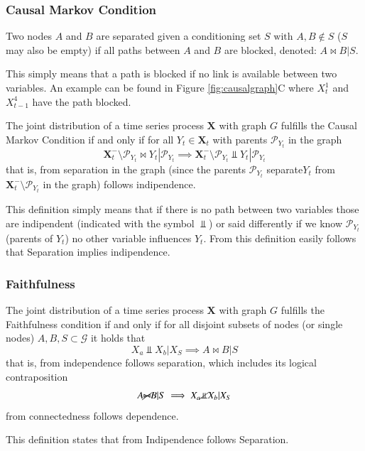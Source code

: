 \subsubsection*{Causal Markov Condition}
\begin{tcolorbox}[colback=red!5!white,colframe=red!75!black,title=\textbf{Separation Definition}]
    Two nodes $A$ and $B$ are separated given a conditioning set $S \text{ with } A, B \notin S$ 
    ($S$ may also be empty) if all paths between $A$ and $B$ are blocked, denoted:
    $A\bowtie B|S$.
\end{tcolorbox}
This simply means that a path is blocked if no link is available between two variables.
An example can be found in Figure \ref{fig:causalgraph}C where $X^1_t$ and $X^4_{t-1}$ have the path blocked.
\begin{tcolorbox}[colback=red!5!white,colframe=red!75!black,title=\textbf{Cusal Markov condition Definition}]
    The joint distribution of a time series process $\bm{X}$ with
    graph $G$ fulfills the Causal Markov Condition if and only if
    for all $Y_t\in \bm{X}_t$ with parents $\mathcal{P}_{Y_t}$ in the graph\\
    \begin{equation*}
        \bm{X}^-_t\setminus\mathcal{P}_{Y_t}\bowtie Y_t | \mathcal{P}_{Y_t}\implies\bm{X}^-_t\setminus\mathcal{P}_{Y_t}\Perp Y_t | \mathcal{P}_{Y_t}
    \end{equation*}
    that is, from separation in the graph (since the parents $\mathcal{P}_{Y_t}$ separate$Y_t$ from $\bm{X}^-_t\setminus\mathcal{P}_{Y_t}$ in the graph) follows indipendence.
\end{tcolorbox}
This definition simply means that if there is no path between two variables those are indipendent (indicated with the symbol $\Perp$) or said differently if we know $\mathcal{P}_{Y_t}$ (parents of $Y_t$) no other variable influences $Y_t$.
From this definition easily follows that Separation implies indipendence.

\subsubsection*{Faithfulness}
\begin{tcolorbox}[colback=red!5!white,colframe=red!75!black,title=\textbf{Faithfulness Definition}]
    The joint distribution of a time series process $\bm{X}$ with
    graph $G$ fulfills the Faithfulness condition if and only if for all
    disjoint subsets of nodes (or single nodes) $A, B, S \subset\mathcal{G}$ it
    holds that
    \begin{equation*}
        X_a \Perp X_b|X_S\implies A\bowtie B|S
    \end{equation*}
    that is, from independence follows separation, which includes its logical contraposition
    \begin{equation*}
        A\cancel{\bowtie} B|S\implies X_a \cancel{\Perp} X_b|X_S
    \end{equation*}
    from connectedness follows dependence.
\end{tcolorbox}
This definition states that from Indipendence follows Separation.

